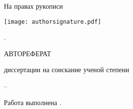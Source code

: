 
%
%
%
%

\thispagestyle{empty}

\begin{center}
	\disscouncil
	\par
\end{center}

\begin{flushright}
На правах рукописи

\texttt{[image: authorsignature.pdf]}\hspace{0.75cm}

\end{flushright}

\vspace{-4mm}
\begin{center}
{\bf \large \dissauthor}
\end{center}

\vspace{2mm}
\begin{center}
{\bf \large \disstitle
\par}

\vspace{10mm}
{%
\specnum. \specname
}

\vspace{10mm}
\MakeUppercase{Автореферат}

диссертации на соискание ученой степени

\edudegree
\end{center}


\vfill
\begin{center}
{\disscouncilcity -- \dissyear}
\end{center}



\newpage
\thispagestyle{empty}
Работа выполнена \dissorgsyn.

